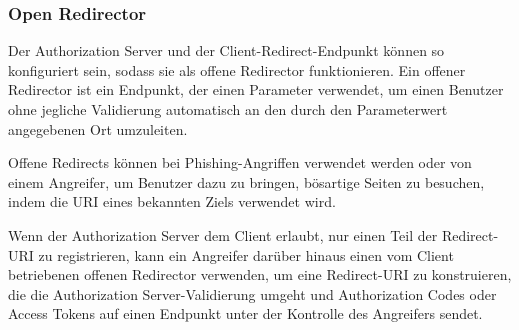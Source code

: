 

\subsubsection{Open Redirector}

Der Authorization Server und der Client-Redirect-Endpunkt können so konfiguriert sein, sodass sie als offene Redirector funktionieren. Ein offener Redirector ist ein Endpunkt, der einen Parameter verwendet, um einen Benutzer ohne jegliche Validierung automatisch an den durch den Parameterwert angegebenen Ort umzuleiten. \cite{OAuthAuthorizationSecurityConsiderations}

Offene Redirects können bei Phishing-Angriffen verwendet werden oder von einem Angreifer, um Benutzer dazu zu bringen, bösartige Seiten zu besuchen, indem die URI eines bekannten Ziels verwendet wird. \cite{OAuthAuthorizationSecurityConsiderations}

Wenn der Authorization Server dem Client erlaubt, nur einen Teil der Redirect-URI zu registrieren, kann ein Angreifer darüber hinaus einen vom Client betriebenen offenen Redirector verwenden, um eine Redirect-URI zu konstruieren, die die Authorization Server-Validierung umgeht und Authorization Codes oder Access Tokens auf einen Endpunkt unter der Kontrolle des Angreifers sendet. \cite{OAuthAuthorizationSecurityConsiderations}

